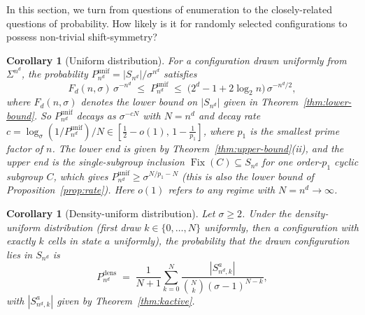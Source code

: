 \documentclass[11pt,a4paper]{article}
\newtheorem{corollary}[theorem]{Corollary}
\theoremstyle{remark}
\DeclareMathOperator{\Fix}{Fix}
\begin{document}
In this section, we turn from questions of enumeration to the closely-related questions of probability.
How likely is it for randomly selected configurations to possess non-trivial shift-symmetry?

\begin{corollary}[Uniform distribution]\label{cor:prob}
For a configuration drawn uniformly from $\Sigma^{n^d}$, the probability
$P^{\mathrm{unif}}_{n^d}=|S_{n^d}|/\sigma^{n^d}$ satisfies
\[
    F_d(n,\sigma)\,\sigma^{-n^d}
    \;\le\; P^{\mathrm{unif}}_{n^d} \;\le\;
    \bigl(2^d-1+2\log_2 n\bigr)\,\sigma^{-n^d/2},
\]
where $F_d(n, \sigma)$ denotes the lower bound on $|S_{n^d}|$ given in Theorem~\ref{thm:lower-bound}.
So $P^{\mathrm{unif}}_{n^d}$ decays as $\sigma^{-cN}$ with
$N=n^d$ and decay rate
$c=\log_\sigma(1/P^{\mathrm{unif}}_{n^d})/N\in
[\tfrac12-o(1),\,1-\tfrac1{p_1}]$, where $p_1$ is the smallest prime
factor of $n$. The lower end is given by Theorem~\ref{thm:upper-bound}(ii), and the
upper end is the single-subgroup inclusion $\Fix(C)\subseteq S_{n^d}$ for
one order-$p_1$ cyclic subgroup $C$, which gives
$P^{\mathrm{unif}}_{n^d}\ge\sigma^{N/p_1-N}$ (this is also the lower bound
of Proposition~\ref{prop:rate}). Here $o(1)$ refers to any regime with
$N=n^d\to\infty$.
\end{corollary}

\begin{corollary}[Density-uniform distribution]\label{cor:dens}
Let $\sigma\ge2$. Under the density-uniform distribution (first draw
$k\in\{0,\dots,N\}$ uniformly, then a configuration with exactly $k$
cells in state $a$ uniformly), the probability that the drawn configuration lies in $S_{n^d}$ is
\[
    P^{\mathrm{dens}}_{n^d} \;=\; \frac{1}{N+1}\sum_{k=0}^{N}
    \frac{|S^a_{n^d,k}|}{\binom Nk(\sigma-1)^{N-k}},
\]
with $|S^a_{n^d,k}|$ given by Theorem~\ref{thm:kactive}.
\end{corollary}
\end{document}
